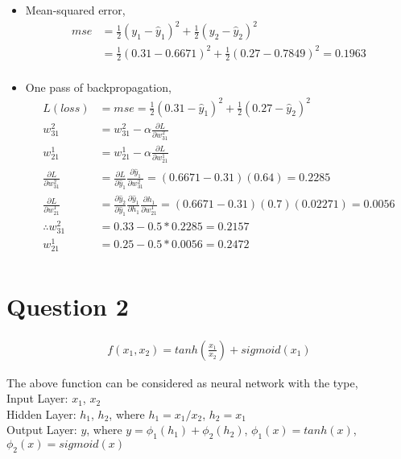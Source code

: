 \documentclass[12pt, letterpaper]{article}
\begin{document}
\begin{itemize}
\item Mean-squared error,
\begin{align*}
  mse &= \frac{1}{2}(y_1 - \hat{y}_1)^2 + \frac{1}{2}(y_2 - \hat{y}_2)^2 \\
  &= \frac{1}{2}(0.31 - 0.6671)^2 + \frac{1}{2}(0.27 - 0.7849)^2 = 0.1963 \\
\end{align*}

\item One pass of backpropagation,
\begin{align*}
  L(loss) &= mse = 
  \frac{1}{2}(0.31 - \hat{y}_1)^2 + \frac{1}{2}(0.27 - \hat{y}_2)^2 \\
  w_{31}^2 &= w_{31}^2 - \alpha \frac{\partial L}{\partial w_{31}^2} \\
  w_{21}^1 &= w_{21}^1 - \alpha \frac{\partial L}{\partial w_{21}^1} \\
  \frac{\partial L}{\partial w_{31}^2} &= \frac{\partial L}{\partial \hat{y}_1}
                                       \frac{\partial \hat{y}_1}{\partial w_{31}^2}
                                      = (0.6671 - 0.31)(0.64) = 0.2285 \\
  \frac{\partial L}{\partial w_{21}^1} &= \frac{\partial \hat{y}_2}{\partial \hat{y}_1}
                                       \frac{\partial \hat{y}_1}{\partial h_1}
                                       \frac{\partial h_1}{\partial w_{21}^1}
                                      = (0.6671 - 0.31)(0.7)(0.02271) = 0.0056 \\
  \therefore w_{31}^2 &= 0.33 - 0.5 * 0.2285 = 0.2157 \\
             w_{21}^1 &= 0.25 - 0.5 * 0.0056 = 0.2472 \\
\end{align*}

\end{itemize}

\pagebreak
\section*{Question 2}

\begin{align*}
  f(x_1, x_2) = tanh \left( \frac{x_1}{x_2} \right) + sigmoid(x_1)
\end{align*}

The above function can be considered as neural network with the type, \\
Input Layer: $x_1$, $x_2$ \\
Hidden Layer: $h_1$, $h_2$, where $h_1 = x_1/x_2$, $h_2 = x_1$ \\
Output Layer: $y$, where $y = \phi_1(h_1) + \phi_2(h_2)$,
$\phi_1(x) = tanh(x)$, $\phi_2(x) = sigmoid(x)$\\
\end{document}
